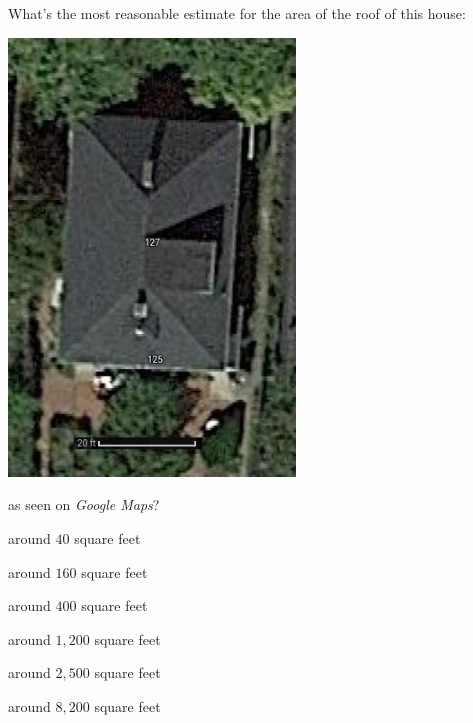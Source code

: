 \documentclass[noauthor,nooutcomes]{ximera}
\begin{document}
\begin{exercise}
  What's the most reasonable estimate for the area of the roof of this
  house:
  \begin{center}
    \includegraphics[width=3in]{mapsHouse.png}
  \end{center}
  as seen on \textit{Google Maps}?
  \begin{enumerate}\begin{multicols}{2}
    \item around $40$ square feet
    \item around $160$ square feet
    \item around $400$ square feet
    \item around $1,200$ square feet 
    \item around $2,500$ square feet %
    \item around $8,200$ square feet
    \end{multicols}
  \end{enumerate}
\end{exercise}
\end{document}
